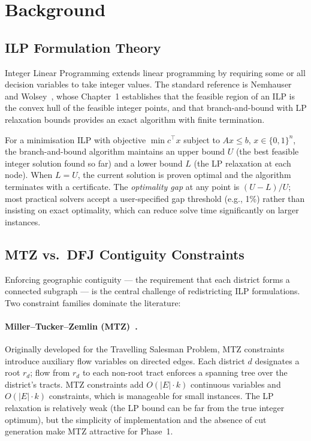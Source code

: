 \section{Background}
\label{sec:background}

\subsection{ILP Formulation Theory}

Integer Linear Programming extends linear programming by requiring some
or all decision variables to take integer values.
The standard reference is Nemhauser and Wolsey~\citeyear{nemhauser1988},
whose Chapter~1 establishes that the feasible region of an ILP is the
convex hull of the feasible integer points, and that branch-and-bound
with LP relaxation bounds provides an exact algorithm with finite
termination.

For a minimisation ILP with objective $\min c^\top x$ subject to
$Ax \leq b$, $x \in \{0,1\}^n$, the branch-and-bound algorithm
maintains an upper bound $U$ (the best feasible integer solution found
so far) and a lower bound $L$ (the LP relaxation at each node).
When $L = U$, the current solution is proven optimal and the algorithm
terminates with a certificate.
The \emph{optimality gap} at any point is $(U - L)/U$; most practical
solvers accept a user-specified gap threshold (e.g., 1\%) rather than
insisting on exact optimality, which can reduce solve time significantly
on larger instances.

\subsection{MTZ vs.\ DFJ Contiguity Constraints}

Enforcing geographic contiguity --- the requirement that each district
forms a connected subgraph --- is the central challenge of redistricting
ILP formulations.
Two constraint families dominate the literature:

\paragraph{Miller--Tucker--Zemlin (MTZ)~\citep{mtz1960}.}
Originally developed for the Travelling Salesman Problem, MTZ constraints
introduce auxiliary flow variables on directed edges.
Each district $d$ designates a root $r_d$; flow from $r_d$ to each
non-root tract enforces a spanning tree over the district's tracts.
MTZ constraints add $O(|E| \cdot k)$ continuous variables and
$O(|E| \cdot k)$ constraints, which is manageable for small instances.
The LP relaxation is relatively weak (the LP bound can be far from the
true integer optimum), but the simplicity of implementation and the
absence of cut generation make MTZ attractive for Phase~1.

